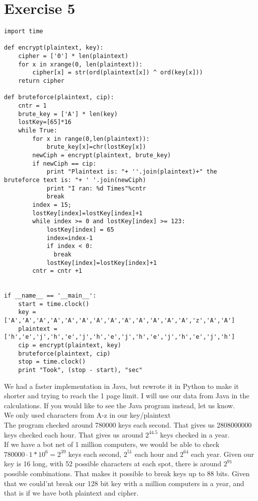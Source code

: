 \documentclass[a4paper,12pt]{article}
\begin{document}
\section*{Exercise 5}
\begin{verbatim}
import time

def encrypt(plaintext, key):
    cipher = ['0'] * len(plaintext)
    for x in xrange(0, len(plaintext)):
        cipher[x] = str(ord(plaintext[x]) ^ ord(key[x]))
    return cipher

def bruteforce(plaintext, cip):
    cntr = 1
    brute_key = ['A'] * len(key)
    lostKey=[65]*16
    while True:
        for x in range(0,len(plaintext)):
            brute_key[x]=chr(lostKey[x])
        newCiph = encrypt(plaintext, brute_key)
        if newCiph == cip:
            print "Plaintext is: "+ ''.join(plaintext)+" the bruteforce text is: "+ ' '.join(newCiph)
            print "I ran: %d Times"%cntr
            break
        index = 15;       
        lostKey[index]=lostKey[index]+1
        while index >= 0 and lostKey[index] >= 123:
            lostKey[index] = 65
            index=index-1
            if index < 0: 
              break
            lostKey[index]=lostKey[index]+1
        cntr = cntr +1


if __name__ == '__main__':
    start = time.clock()
    key = ['A','A','A','A','A','A','A','A','A','A','A','A','A','z','A','A']
    plaintext = ['h','e','j','h','e','j','h','e','j','h','e','j','h','e','j','h']
    cip = encrypt(plaintext, key)
    bruteforce(plaintext, cip)
    stop = time.clock()
    print "Took", (stop - start), "sec"
\end{verbatim}
We had a faster implementation in Java, but rewrote it in Python to make it shorter and trying to reach the 1 page limit. I will use our data from Java in the calculations. If you would like to see the Java program instead, let us know.\\
We only used characters from A-z in our key/plaintext\\
The program checked around 780000 keys each second. That gives us 2808000000 keys checked each hour. That gives us around $2^{44.5}$ keys checked in a year.\\
If we have a bot net of 1 million computers, we would be able to check $780000 \cdot 1*10^6 = 2^{39}$ keys each second, $2^{51}$ each hour and $2^{64}$ each year. Given our key is 16 long, with 52 possible characters at each spot, there is around $2^{91}$ possible combinations. That makes it possible to break keys up to 88 bits. Given that we could'nt break our 128 bit key with a million computers in a year, and that is if we have both plaintext and cipher.
\end{document}

